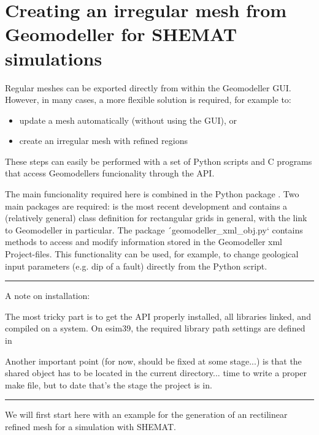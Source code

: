 \documentclass[letterpaper,10pt,english]{sphinxmanual}
\begin{document}
\chapter{Creating an irregular mesh from Geomodeller for SHEMAT simulations}
\label{Geomodeller-Export::doc}\label{Geomodeller-Export:creating-an-irregular-mesh-from-geomodeller-for-shemat-simulations}
Regular meshes can be exported directly from within the Geomodeller GUI.
However, in many cases, a more flexible solution is required, for
example to:
\begin{itemize}
\item {} 
update a mesh automatically (without using the GUI), or

\item {} 
create an irregular mesh with refined regions

\end{itemize}

These steps can easily be performed with a set of Python scripts and C
programs that access Geomodellers funcionality through the API.

The main funcionality required here is combined in the Python package
. Two main packages are required:  is the most
recent development and contains a (relatively general) class definition
for rectangular grids in general, with the link to Geomodeller in
particular. The package ´geomodeller\_xml\_obj.py{}` contains methods to
access and modify information stored in the Geomodeller xml
Project-files. This functionality can be used, for example, to change
geological input parameters (e.g. dip of a fault) directly from the
Python script.


\bigskip\hrule{}\bigskip


A note on installation:

The most tricky part is to get the API properly installed, all libraries
linked, and compiled on a system. On esim39, the required library path
settings are defined in


Another important point (for now, should be fixed at some stage...) is
that the shared object  has to be located in the current
directory... time to write a proper make file, but to date that's the
stage the project is in.


\bigskip\hrule{}\bigskip


We will first start here with an example for the generation of an
rectilinear refined mesh for a simulation with SHEMAT.
\end{document}
